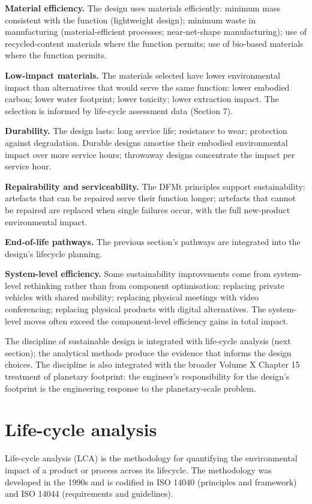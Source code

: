 \textbf{Material efficiency.} The design uses materials efficiently: minimum mass consistent with the function (lightweight design); minimum waste in manufacturing (material-efficient processes; near-net-shape manufacturing); use of recycled-content materials where the function permits; use of bio-based materials where the function permits.

\textbf{Low-impact materials.} The materials selected have lower environmental impact than alternatives that would serve the same function: lower embodied carbon; lower water footprint; lower toxicity; lower extraction impact. The selection is informed by life-cycle assessment data (Section 7).

\textbf{Durability.} The design lasts: long service life; resistance to wear; protection against degradation. Durable designs amortise their embodied environmental impact over more service hours; throwaway designs concentrate the impact per service hour.

\textbf{Repairability and serviceability.} The DFMt principles support sustainability: artefacts that can be repaired serve their function longer; artefacts that cannot be repaired are replaced when single failures occur, with the full new-product environmental impact.

\textbf{End-of-life pathways.} The previous section's pathways are integrated into the design's lifecycle planning.

\textbf{System-level efficiency.} Some sustainability improvements come from system-level rethinking rather than from component optimisation: replacing private vehicles with shared mobility; replacing physical meetings with video conferencing; replacing physical products with digital alternatives. The system-level moves often exceed the component-level efficiency gains in total impact.

The discipline of sustainable design is integrated with life-cycle analysis (next section); the analytical methods produce the evidence that informs the design choices. The discipline is also integrated with the broader Volume X Chapter 15 treatment of planetary footprint: the engineer's responsibility for the design's footprint is the engineering response to the planetary-scale problem.

\section{Life-cycle analysis}

Life-cycle analysis (LCA) is the methodology for quantifying the environmental impact of a product or process across its lifecycle. The methodology was developed in the 1990s and is codified in ISO 14040 (principles and framework) and ISO 14044 (requirements and guidelines).

